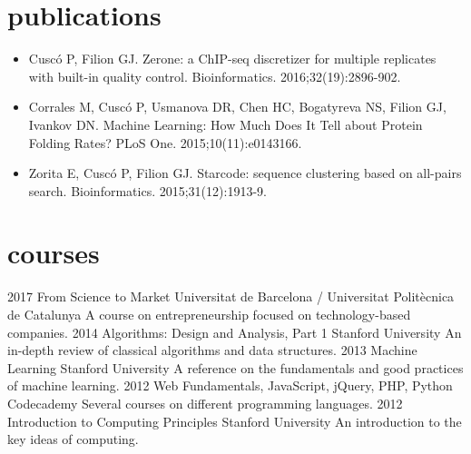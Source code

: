 \documentclass[]{friggeri-cv} %
\begin{document}
\section{publications}


\begin{itemize}
    \item Cuscó P, Filion GJ. Zerone: a ChIP-seq discretizer for
        multiple replicates with built-in quality control.
        Bioinformatics. 2016;32(19):2896-902.
    \item Corrales M, Cuscó P, Usmanova DR, Chen HC, Bogatyreva NS,
        Filion GJ, Ivankov DN. Machine Learning: How Much Does It
        Tell about Protein Folding Rates? PLoS One.
        2015;10(11):e0143166.
    \item Zorita E, Cuscó P, Filion GJ. Starcode: sequence clustering
        based on all-pairs search. Bioinformatics. 2015;31(12):1913-9.
\end{itemize}


\section{courses}

\begin{entrylist}
  \entry
    {2017}
    {From Science to Market}
    {Universitat de Barcelona / Universitat Politècnica de Catalunya}
    {A course on entrepreneurship focused on technology-based
    companies.}
  \entry
    {2014}
    {Algorithms: Design and Analysis, Part 1}
    {Stanford University}
    {An in-depth review of classical algorithms and data structures.}
  \entry
    {2013}
    {Machine Learning}
    {Stanford University}
    {A reference on the fundamentals and good practices of
    machine learning.}
  \entry
    {2012}
    {Web Fundamentals, JavaScript, jQuery, PHP, Python}
    {Codecademy}
    {Several courses on different programming languages.}
  \entry
    {2012}
    {Introduction to Computing Principles}
    {Stanford University}
    {An introduction to the key ideas of computing.}
\end{entrylist}

\end{document}
